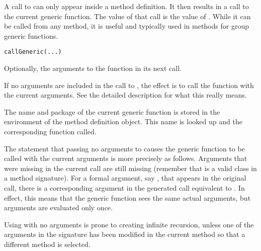 %
\begin{Description}\relax
A call to  can only appear inside a method
definition.  It then results in a call to the current generic
function.  The value of that call is the value of .
While it can be called from any method, it is useful and typically
used in methods for group generic functions.
\end{Description}
%
\begin{Usage}
\begin{verbatim}
callGeneric(...)
\end{verbatim}
\end{Usage}
%
\begin{Arguments}
\begin{ldescription}
\item[\code{...}] 
Optionally, the arguments to the function in its next call.

If no arguments are included in the call to , the
effect is to call the function with the current arguments.
See the detailed description for what this really means.

\end{ldescription}
\end{Arguments}
%
\begin{Details}\relax
The name and package of the current generic function is stored in the
environment of the method definition object.  This name is looked up
and the corresponding function called.

The statement that passing no arguments to  causes
the generic  function to be called with the current arguments is
more precisely as follows.  Arguments that were missing in the current
call are still missing (remember that  is a valid
class in a method signature).  For a formal argument, say , that
appears in the original call, there is a corresponding argument in the
generated call equivalent to .  In effect, this
means that the generic function sees the same actual arguments, but
arguments are evaluated only once.

Using  with no arguments is prone to creating
infinite recursion, unless one of the arguments in the signature has
been modified in the current method so that a different method is selected.
\end{Details}
